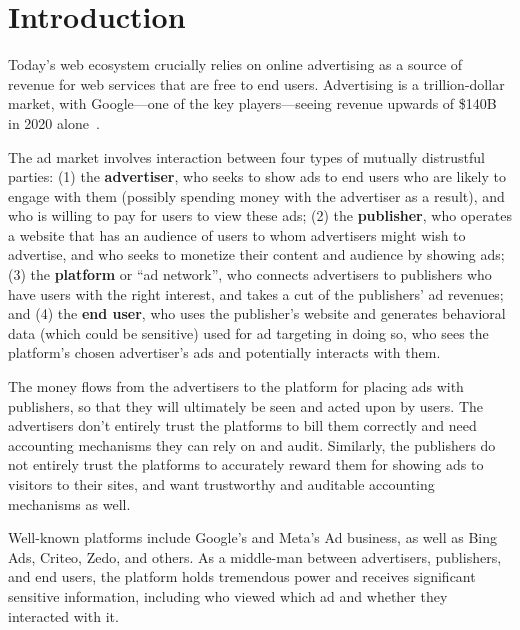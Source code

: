 \section{Introduction}
\label{s:overview}


Today's web ecosystem crucially relies on online advertising as a source of
revenue for web services that are free to end users.
%
Advertising is a trillion-dollar market, with Google---one of the key
players---seeing revenue upwards of \$140B in 2020 alone~\cite{google-ad-revenue}.
%

The ad market involves interaction between four types of mutually distrustful parties:
(1) the \textbf{advertiser}, who seeks to show ads to end users who
   are likely to engage with them (possibly spending money with the
   advertiser as a result), and who is willing to pay for users to view
   these ads;
(2) the \textbf{publisher}, who operates a website that has an audience
   of users to whom advertisers might wish to advertise, and who seeks
   to monetize their content and audience by showing ads;
 (3) the \textbf{platform} or ``ad network'', who connects advertisers
   to publishers who have users with the right interest, and takes a cut
   of the publishers' ad revenues; and
 (4) the \textbf{end user}, who uses the publisher's website and generates
   behavioral data (which could be sensitive) used for ad targeting in doing so,
   who sees the platform's chosen advertiser's ads and potentially interacts
   with them.

The money flows from the advertisers to the platform for placing ads with publishers, so that they will ultimately be seen and acted upon by users.
%
The advertisers don't entirely trust the platforms to bill them correctly and need accounting mechanisms they can rely on and audit.
%
Similarly, the publishers do not entirely trust the platforms to accurately reward them for showing ads to visitors to their sites, and want trustworthy and auditable accounting mechanisms as well.

%
Well-known platforms include Google's and Meta's Ad business, as well
as Bing Ads, Criteo, Zedo, and others.
%
As a middle-man between advertisers, publishers, and end users, the platform
holds tremendous power and receives significant sensitive information, including
who viewed which ad and whether they interacted with it.
%
%
%

